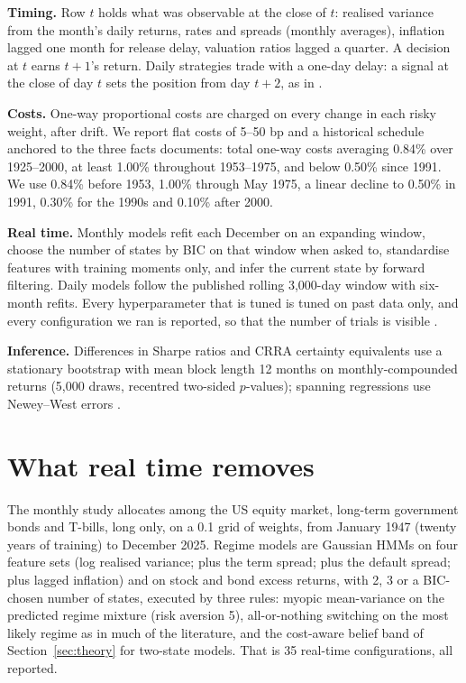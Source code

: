 \documentclass[sigconf,nonacm]{acmart}
\begin{document}
\textbf{Timing.} Row $t$ holds what was observable at the close of $t$: realised variance from the month's daily returns, rates and spreads (monthly averages), inflation lagged one month for release delay, valuation ratios lagged a quarter. A decision at $t$ earns $t+1$'s return. Daily strategies trade with a one-day delay: a signal at the close of day $t$ sets the position from day $t+2$, as in \citet{shu2024downside}.

\textbf{Costs.} One-way proportional costs are charged on every change in each risky weight, after drift. We report flat costs of 5--50 bp and a historical schedule anchored to the three facts \citet{jones2002century} documents: total one-way costs averaging 0.84\% over 1925--2000, at least 1.00\% throughout 1953--1975, and below 0.50\% since 1991. We use 0.84\% before 1953, 1.00\% through May 1975, a linear decline to 0.50\% in 1991, 0.30\% for the 1990s and 0.10\% after 2000.

\textbf{Real time.} Monthly models refit each December on an expanding window, choose the number of states by BIC on that window when asked to, standardise features with training moments only, and infer the current state by forward filtering. Daily models follow the published rolling 3,000-day window with six-month refits. Every hyperparameter that is tuned is tuned on past data only, and every configuration we ran is reported, so that the number of trials is visible \cite{bailey2014deflated,harvey2016cross}.

\textbf{Inference.} Differences in Sharpe ratios and CRRA certainty equivalents use a stationary bootstrap \cite{politis1994stationary} with mean block length 12 months on monthly-compounded returns (5,000 draws, recentred two-sided $p$-values); spanning regressions use Newey--West errors \cite{newey1987simple}.

\section{What real time removes}\label{sec:ladder}
The monthly study allocates among the US equity market, long-term government bonds and T-bills, long only, on a 0.1 grid of weights, from January 1947 (twenty years of training) to December 2025. Regime models are Gaussian HMMs on four feature sets (log realised variance; plus the term spread; plus the default spread; plus lagged inflation) and on stock and bond excess returns, with 2, 3 or a BIC-chosen number of states, executed by three rules: myopic mean-variance on the predicted regime mixture (risk aversion 5), all-or-nothing switching on the most likely regime as in much of the literature, and the cost-aware belief band of Section~\ref{sec:theory} for two-state models. That is 35 real-time configurations, all reported.
\end{document}
